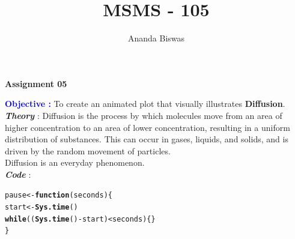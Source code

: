 \documentclass[11pt, a4paper]{article}\usepackage[]{graphicx}\usepackage[]{xcolor}
\title{MSMS - 105}
\author{Ananda Biswas}
\date{}
\makeatletter
\newcommand{\hlopt}[1]{\textcolor[rgb]{0,0,0}{#1}}%
\newcommand{\hldef}[1]{\textcolor[rgb]{0.345,0.345,0.345}{#1}}%
\newcommand{\hlkwa}[1]{\textcolor[rgb]{0.161,0.373,0.58}{\textbf{#1}}}%
\newcommand{\hlkwb}[1]{\textcolor[rgb]{0.69,0.353,0.396}{#1}}%
\newcommand{\hlkwc}[1]{\textcolor[rgb]{0.333,0.667,0.333}{#1}}%
\newcommand{\hlkwd}[1]{\textcolor[rgb]{0.737,0.353,0.396}{\textbf{#1}}}%
\newenvironment{kframe}{%
 \def\at@end@of@kframe{}%
 \ifinner\ifhmode%
  \def\at@end@of@kframe{\end{minipage}}%
  \begin{minipage}{\columnwidth}%
 \fi\fi%
 \def\FrameCommand##1{\hskip\@totalleftmargin \hskip-\fboxsep
 \colorbox{shadecolor}{##1}\hskip-\fboxsep
     \hskip-\linewidth \hskip-\@totalleftmargin \hskip\columnwidth}%
 \MakeFramed {\advance\hsize-\width
   \@totalleftmargin\z@ \linewidth\hsize
   \@setminipage}}%
 {\par\unskip\endMakeFramed%
 \at@end@of@kframe}
\newenvironment{knitrout}{}{} %
\makeatother
\begin{document}
\maketitle

\begin{center}
\textbf{Assignment 05}
\end{center}


\OrnamentDiamondSolid \hspace{0.5cm} \textcolor{blue}{\textbf{Objective :}} To create an animated plot that visually illustrates \textbf{Diffusion}. \\

\faArrowAltCircleRight[regular] \textcolor{col1}{\textbf{\textit{Theory}}} : Diffusion is the process by which molecules move from an area of higher concentration to an area of lower concentration, resulting in a uniform distribution of substances. This can occur in gases, liquids, and solids, and is driven by the random movement of particles. \\

\hspace{1cm} Diffusion is an everyday phenomenon. \\


\faArrowAltCircleRight[regular] \textcolor{col1}{\textbf{\textit{Code}}} : 

\begin{knitrout}\footnotesize
{}\color{fgcolor}\begin{kframe}
\begin{alltt}
\hldef{pause} \hlkwb{<-} \hlkwa{function}\hldef{(}\hlkwc{seconds}\hldef{)\{}
  \hldef{start} \hlkwb{<-} \hlkwd{Sys.time}\hldef{()}
  \hlkwa{while}\hldef{((}\hlkwd{Sys.time}\hldef{()} \hlopt{-} \hldef{start)} \hlopt{<} \hldef{seconds)\{\}}
\hldef{\}}
\end{alltt}
\end{kframe}
\end{knitrout}
\end{document}
